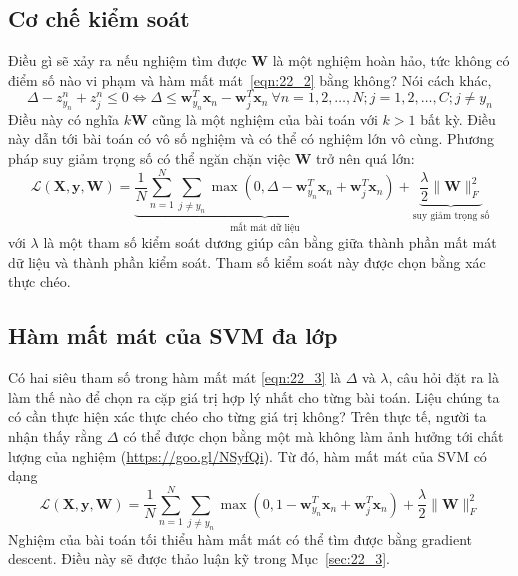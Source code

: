  
 
\subsection{Cơ chế kiểm soát}
Điều gì sẽ xảy ra nếu nghiệm tìm được $\mathbf{W}$ là một nghiệm hoàn hảo, tức không có điểm số nào {vi phạm} và hàm mất mát~\eqref{eqn:22_2}
bằng không? Nói cách khác,
\begin{equation*}
 \Delta - z_{y_n}^n + z_j^n   \leq 0 \Leftrightarrow \Delta \leq \mathbf{w}_{y_n}^T \mathbf{x}_n - \mathbf{w}_j^T\mathbf{x}_n~\forall n = 1, 2, \dots, N; j = 1, 2, \dots, C; j \neq y_n 
\end{equation*} 
Điều này có nghĩa $k\mathbf{W}$ cũng là một nghiệm của bài toán với $k > 1$
bất kỳ. Điều này dẫn tới bài toán có vô số nghiệm và có thể có nghiệm lớn vô cùng. Phương pháp suy giảm trọng số có thể ngăn chặn việc $\mathbf{W}$ trở nên quá lớn:
\begin{equation} 
\label{eqn:22_3}
\mathcal{L}(\mathbf{X}, \mathbf{y}, \mathbf{W}) = \underbrace{\frac{1}{N}\sum_{n=1}^N \sum_{j \neq y_n} \max(0, \Delta - \mathbf{w}_{y_n}^T \mathbf{x}_n + \mathbf{w}_j^T\mathbf{x}_n)}_{\text{mất mát dữ liệu}} + \underbrace{\frac{\lambda}{2} \|\mathbf{W}\|_F^2}_{\text{suy giảm trọng số}}
\end{equation} 
với $\lambda$ là một tham số kiểm soát dương giúp cân bằng giữa thành phần mất
mát dữ liệu và thành phần kiểm soát. Tham số kiểm soát này được chọn bằng xác
thực chéo.
 
\subsection{Hàm mất mát của SVM đa lớp}
 
Có hai siêu tham số trong hàm mất mát \eqref{eqn:22_3} là $\Delta$ và $\lambda$,
câu hỏi đặt ra là làm thế nào để chọn ra cặp giá trị hợp lý nhất cho từng bài
toán. Liệu chúng ta có cần thực hiện xác thực chéo cho từng giá trị không? Trên thực
tế, người ta nhận thấy rằng $\Delta$ có thể được chọn bằng một mà không làm ảnh
hưởng tới chất lượng của nghiệm (\url{https://goo.gl/NSyfQi}). Từ đó, hàm mất
mát của SVM có dạng
\begin{equation} 
\label{eqn:22_4}
\mathcal{L}(\mathbf{X}, \mathbf{y}, \mathbf{W}) = \frac{1}{N}\sum_{n=1}^N \sum_{j \neq y_n} \max(0, 1 - \mathbf{w}_{y_n}^T \mathbf{x}_n + \mathbf{w}_j^T\mathbf{x}_n) + \frac{\lambda}{2} \|\mathbf{W}\|_F^2
\end{equation} 
Nghiệm của bài toán tối thiểu hàm mất mát có thể tìm được bằng gradient descent.
Điều này sẽ được thảo luận kỹ trong Mục~\ref{sec:22_3}.
 
